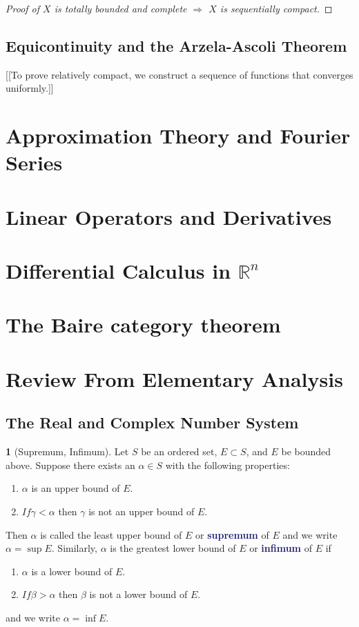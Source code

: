 \documentclass[12pt]{article}
\numberwithin{equation}{section}
\newcommand{\navy}[1]{\textcolor{MidnightBlue}{\bf #1}}
\theoremstyle{plain}
\theoremstyle{definition}
\newtheorem{definition}{\color{MidnightBlue}{\textbf{Definition}}}[section]
\def\imp{\Rightarrow}
\newcommand{\1}{\mathbbm 1}
\newcommand{\RR}{\mathbb R}
\begin{document}
\begin{proof}[Proof of $X$ is totally bounded and complete $\imp$ $X$ is sequentially compact]
\end{proof}

\subsection{Equicontinuity and the Arzela-Ascoli Theorem}

[[To prove relatively compact, we construct a sequence of functions that converges uniformly.]]

\newpage



\section{Approximation Theory and Fourier Series}

\section{Linear Operators and Derivatives}

\section[Differential Calculus in Rn]{Differential Calculus in $\RR^n$}

\section{The Baire category theorem}

\appendix

\section{Review From Elementary Analysis}

\subsection{The Real and Complex Number System}

\begin{definition}[Supremum, Infimum]
	Let $S$ be an ordered set, $E \subset S$, and $E$ be bounded above. Suppose there exists an $\alpha \in S$ with the following properties:
	\begin{enumerate}
		\item $\alpha$ is an upper bound of $E$.
		\item $If \gamma < \alpha$ then $\gamma$ is not an upper bound of $E$.
	\end{enumerate}
	Then $\alpha$ is called the least upper bound of $E$ or \navy{supremum} of $E$ and we write $\alpha = \sup E$. Similarly, $\alpha$ is the greatest lower bound of $E$ or \navy{infimum} of $E$ if 
	\begin{enumerate}
		\item $\alpha$ is a lower bound of $E$.
		\item $If \beta > \alpha$ then $\beta$ is not a lower bound of $E$.
	\end{enumerate}
	and we write $\alpha = \inf E$.
\end{definition}
\end{document}
